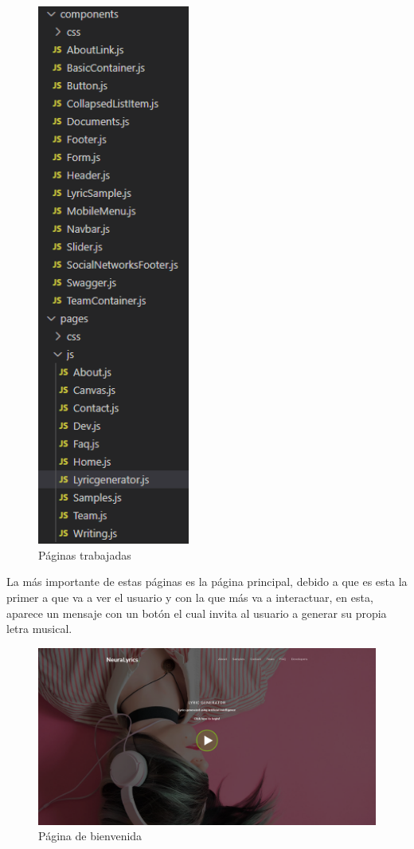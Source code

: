 \documentclass[12pt, a4paper, titlepage]{article}
\begin{document}
	\begin{figure}[H]
		\includegraphics[width=5cm]{./Imagenes/AplicacionWeb/Paginas.png}
		\centering 
		\caption{Páginas trabajadas}
	\end{figure}
	La más importante de estas páginas es la página principal, debido a que es esta la primer a que va a ver el usuario y con la que más va a interactuar, en esta, aparece un mensaje con un botón el cual invita al usuario a generar su propia letra musical.
	\begin{figure}[H]
		\includegraphics[width=13.5cm]{./Imagenes/AplicacionWeb/Paginaweb.png}
		\centering 
		\caption{Página de bienvenida}
	\end{figure}
\end{document}
